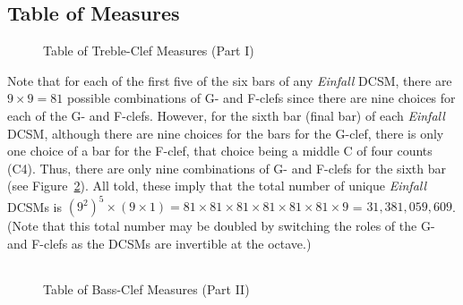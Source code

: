 \documentclass[a4paper,x11names,svgnames,10pt]{article}
\begin{document}
{\subsection{Table of Measures}\label{tabMeas}

\begin{figure}[H]
	\centering
	\def\svgwidth{0.975\columnwidth}
	
	\caption{Table of Treble-Clef Measures (Part I)}
	\label{fig:meas1}
\end{figure}

Note that for each of the first five of the six bars of any {\it Einfall} DCSM, there are $9\times 9 = 81$ possible combinations of G- and F-clefs since there are nine choices for each of the G- and F-clefs. However, for the sixth bar (final bar) of each {\it Einfall } DCSM, although there are nine choices for the bars for the G-clef, there is only one choice of a bar for the F-clef, that choice being a middle C of four counts (C4). Thus, there are only nine combinations of G- and F-clefs for the sixth bar (see Figure~\ref{fig:meas2}). All told, these imply that the total number of unique {\it Einfall} DCSMs is $(9^2)^5 \times (9\times 1) = 81\times 81 \times 81 \times 81 \times 81\times 81 \times 9$ = $31,\!381,\!059,\!609$. (Note that this total number may be doubled by switching the roles of the G- and F-clefs as the DCSMs are invertible at the octave.)

${}_{}$\\
\vspace{0.10in}
\begin{figure}[H]
	\centering
	\def\svgwidth{0.975\columnwidth}
	
	\caption{Table of Bass-Clef Measures (Part II)}
	\label{fig:meas2}
\end{figure}

%	

}
\end{document}
